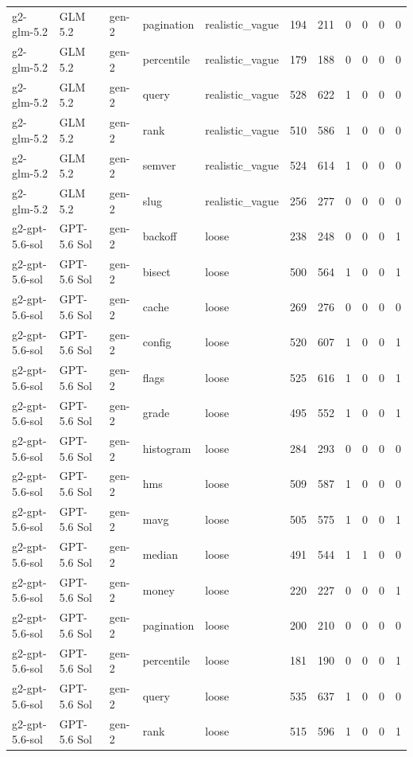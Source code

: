 \begin{tabular}{lllllllllll}
g2-glm-5.2 & GLM 5.2 & gen-2 & pagination & realistic\_vague & 194 & 211 & 0 & 0 & 0 & 0 \\
g2-glm-5.2 & GLM 5.2 & gen-2 & percentile & realistic\_vague & 179 & 188 & 0 & 0 & 0 & 0 \\
g2-glm-5.2 & GLM 5.2 & gen-2 & query & realistic\_vague & 528 & 622 & 1 & 0 & 0 & 0 \\
g2-glm-5.2 & GLM 5.2 & gen-2 & rank & realistic\_vague & 510 & 586 & 1 & 0 & 0 & 0 \\
g2-glm-5.2 & GLM 5.2 & gen-2 & semver & realistic\_vague & 524 & 614 & 1 & 0 & 0 & 0 \\
g2-glm-5.2 & GLM 5.2 & gen-2 & slug & realistic\_vague & 256 & 277 & 0 & 0 & 0 & 0 \\
g2-gpt-5.6-sol & GPT-5.6 Sol & gen-2 & backoff & loose & 238 & 248 & 0 & 0 & 0 & 1 \\
g2-gpt-5.6-sol & GPT-5.6 Sol & gen-2 & bisect & loose & 500 & 564 & 1 & 0 & 0 & 1 \\
g2-gpt-5.6-sol & GPT-5.6 Sol & gen-2 & cache & loose & 269 & 276 & 0 & 0 & 0 & 0 \\
g2-gpt-5.6-sol & GPT-5.6 Sol & gen-2 & config & loose & 520 & 607 & 1 & 0 & 0 & 1 \\
g2-gpt-5.6-sol & GPT-5.6 Sol & gen-2 & flags & loose & 525 & 616 & 1 & 0 & 0 & 1 \\
g2-gpt-5.6-sol & GPT-5.6 Sol & gen-2 & grade & loose & 495 & 552 & 1 & 0 & 0 & 1 \\
g2-gpt-5.6-sol & GPT-5.6 Sol & gen-2 & histogram & loose & 284 & 293 & 0 & 0 & 0 & 0 \\
g2-gpt-5.6-sol & GPT-5.6 Sol & gen-2 & hms & loose & 509 & 587 & 1 & 0 & 0 & 0 \\
g2-gpt-5.6-sol & GPT-5.6 Sol & gen-2 & mavg & loose & 505 & 575 & 1 & 0 & 0 & 1 \\
g2-gpt-5.6-sol & GPT-5.6 Sol & gen-2 & median & loose & 491 & 544 & 1 & 1 & 0 & 0 \\
g2-gpt-5.6-sol & GPT-5.6 Sol & gen-2 & money & loose & 220 & 227 & 0 & 0 & 0 & 1 \\
g2-gpt-5.6-sol & GPT-5.6 Sol & gen-2 & pagination & loose & 200 & 210 & 0 & 0 & 0 & 0 \\
g2-gpt-5.6-sol & GPT-5.6 Sol & gen-2 & percentile & loose & 181 & 190 & 0 & 0 & 0 & 1 \\
g2-gpt-5.6-sol & GPT-5.6 Sol & gen-2 & query & loose & 535 & 637 & 1 & 0 & 0 & 0 \\
g2-gpt-5.6-sol & GPT-5.6 Sol & gen-2 & rank & loose & 515 & 596 & 1 & 0 & 0 & 1 \\

\end{tabular}
